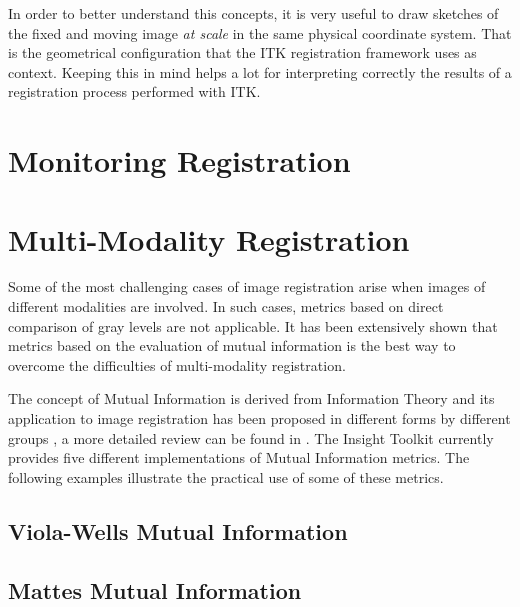 In order to better understand this concepts, it is very useful to draw sketches
of the fixed and moving image {\em at scale} in the same physical coordinate
system. That is the geometrical configuration that the ITK registration
framework uses as context. Keeping this in mind helps a lot for interpreting
correctly the results of a registration process performed with ITK.

\section{Monitoring Registration}
\label{sec:MonitoringImageRegistration}
\ifitkFullVersion

\fi



\section{Multi-Modality Registration}
\label{sec:MultiModalityRegistration}

Some of the most challenging cases of image registration arise when images of
different modalities are involved. In such cases, metrics based on direct
comparison of gray levels are not applicable. It has been extensively shown
that metrics based on the evaluation of mutual information is the best way to
overcome the difficulties of multi-modality registration.


The concept of Mutual Information is derived from Information Theory and its
application to image registration has been proposed in different forms by
different groups \cite{Collignon1995,Maes97,Viola1997}, a more detailed review
can be found in \cite{Hajnal2001,Pluim2003}. The Insight Toolkit currently
provides five different implementations of Mutual Information metrics. The
following examples illustrate the practical use of some of these metrics.

\subsection{Viola-Wells Mutual Information}
\label{sec:MultiModalityRegistrationViolaWells}
\ifitkFullVersion

\fi

\subsection{Mattes Mutual Information}
\label{sec:MultiModalityRegistrationMattes}
\ifitkFullVersion

\fi


